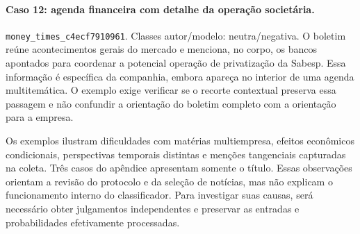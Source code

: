 \paragraph{Caso 12: agenda financeira com detalhe da operação societária.}
\texttt{money\_\allowbreak{}times\_\allowbreak{}c4ecf7910961}. Classes autor/modelo: neutra/negativa. O boletim reúne acontecimentos gerais do mercado e menciona, no corpo, os bancos apontados para coordenar a potencial operação de privatização da Sabesp. Essa informação é específica da companhia, embora apareça no interior de uma agenda multitemática. O exemplo exige verificar se o recorte contextual preserva essa passagem e não confundir a orientação do boletim completo com a orientação para a empresa.

Os exemplos ilustram dificuldades com matérias multiempresa, efeitos econômicos condicionais, perspectivas temporais distintas e menções tangenciais capturadas na coleta. Três casos do apêndice apresentam somente o título. Essas observações orientam a revisão do protocolo e da seleção de notícias, mas não explicam o funcionamento interno do classificador. Para investigar suas causas, será necessário obter julgamentos independentes e preservar as entradas e probabilidades efetivamente processadas.
